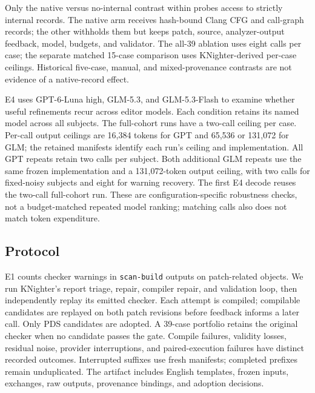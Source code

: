 Only the native versus no-internal contrast within \toolname probes access to strictly internal records. The native arm receives hash-bound Clang CFG and call-graph records; the other withholds them but keeps patch, source, analyzer-output feedback, model, budgets, and validator. The all-39 ablation uses eight calls per case; the separate matched 15-case comparison uses KNighter-derived per-case ceilings. Historical five-case, manual, and mixed-provenance contrasts are not evidence of a native-record effect.

E4 uses GPT-6-Luna high, GLM-5.3, and GLM-5.3-Flash to examine whether useful refinements recur across editor models. Each condition retains its named model across all subjects. The full-cohort runs have a two-call ceiling per case. Per-call output ceilings are 16,384 tokens for GPT and 65,536 or 131,072 for GLM; the retained manifests identify each run's ceiling and implementation. All GPT repeats retain two calls per subject. Both additional GLM repeats use the same frozen implementation and a 131,072-token output ceiling, with two calls for fixed-noisy subjects and eight for warning recovery. The first E4 decode reuses the two-call full-cohort run. These are configuration-specific robustness checks, not a budget-matched repeated model ranking; matching calls also does not match token expenditure.

\subsection{Protocol}

E1 counts checker warnings in \texttt{scan-build} outputs on patch-related objects. We run KNighter's report triage, repair, compiler repair, and validation loop, then independently replay its emitted checker. Each \toolname attempt is compiled; compilable candidates are replayed on both patch revisions before feedback informs a later call. Only PDS candidates are adopted. A 39-case portfolio retains the original checker when no candidate passes the gate. Compile failures, validity losses, residual noise, provider interruptions, and paired-execution failures have distinct recorded outcomes. Interrupted suffixes use fresh manifests; completed prefixes remain unduplicated. The artifact includes English templates, frozen inputs, exchanges, raw outputs, provenance bindings, and adoption decisions.

